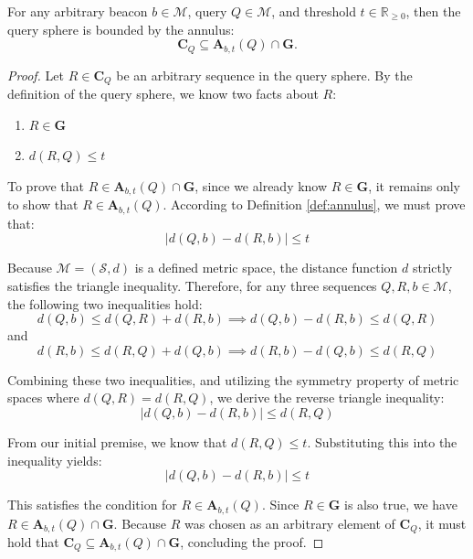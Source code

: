 \documentclass[10pt,runningheads]{llncs}
\begin{document}
\begin{theorem}
For any arbitrary beacon $b \in \mathcal{M}$, query $Q \in \mathcal{M}$, and threshold $t \in \mathbb{R}_{\geq0}$, then the query sphere is bounded by the annulus:
\begin{equation}
    \textbf{C}_Q \subseteq \textbf{A}_{b, t}(Q) \cap \textbf{G}.
\end{equation}
    \label{thm:ballinann}
\end{theorem}

\begin{proof}
Let $R \in \textbf{C}_Q$ be an arbitrary sequence in the query sphere. By the definition of the query sphere, we know two facts about $R$:
\begin{enumerate}
    \item $R \in \textbf{G}$
    \item $d(R, Q) \leq t$
\end{enumerate}

To prove that $R \in \textbf{A}_{b, t}(Q) \cap \textbf{G}$, since we already know $R \in \textbf{G}$, it remains only to show that $R \in \textbf{A}_{b, t}(Q)$. According to Definition \ref{def:annulus}, we must prove that:
\begin{equation*}
    |d(Q, b) - d(R, b)| \leq t
\end{equation*}

Because $\mathcal{M} = (\mathcal{S}, d)$ is a defined metric space, the distance function $d$ strictly satisfies the triangle inequality. Therefore, for any three sequences $Q, R, b \in \mathcal{M}$, the following two inequalities hold:
\begin{equation*}
    d(Q, b) \leq d(Q, R) + d(R, b) \implies d(Q, b) - d(R, b) \leq d(Q, R)
\end{equation*}
and
\begin{equation*}
    d(R, b) \leq d(R, Q) + d(Q, b) \implies d(R, b) - d(Q, b) \leq d(R, Q)
\end{equation*}

Combining these two inequalities, and utilizing the symmetry property of metric spaces where $d(Q, R) = d(R, Q)$, we derive the reverse triangle inequality:
\begin{equation*}
    |d(Q, b) - d(R, b)| \leq d(R, Q)
\end{equation*}

From our initial premise, we know that $d(R, Q) \leq t$. Substituting this into the inequality yields:
\begin{equation*}
    |d(Q, b) - d(R, b)| \leq t
\end{equation*}

This satisfies the condition for $R \in \textbf{A}_{b, t}(Q)$. Since $R \in \textbf{G}$ is also true, we have $R \in \textbf{A}_{b, t}(Q) \cap \textbf{G}$. Because $R$ was chosen as an arbitrary element of $\textbf{C}_Q$, it must hold that $\textbf{C}_Q \subseteq \textbf{A}_{b, t}(Q) \cap \textbf{G}$, concluding the proof.
\end{proof}
\end{document}

